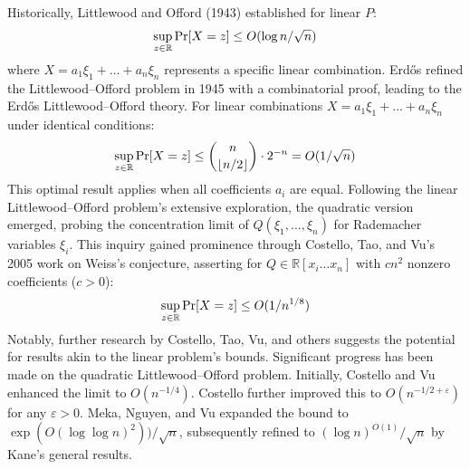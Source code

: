 Historically, Littlewood and Offord (1943) established for linear $P$:
\vspace{-0.4\baselineskip}
\[ \sup_{z\in\mathbb{R}} \Pr[X=z] \leq O(\log n/\sqrt{n}) \vspace{-0.8\baselineskip} \]
\newline
where $X = a_1\xi_1 + \ldots + a_n\xi_n$ represents a specific linear combination.
Erdős refined the Littlewood–Offord problem in 1945 with a combinatorial proof, leading to the Erdős Littlewood–Offord theory. For linear combinations $X = a_1\xi_1 + \ldots + a_n\xi_n$ under identical conditions:
\vspace{-0.2\baselineskip}
\[ \sup_{z\in\mathbb{R}} \Pr[X=z] \leq \binom{n}{\lfloor n/2 \rfloor} \cdot 2^{-n} = O(1/\sqrt{n}) \vspace{-0.5\baselineskip} \]
\newline
This optimal result applies when all coefficients $a_i$ are equal.
Following the linear Littlewood–Offord problem's extensive exploration, the quadratic version emerged, probing the concentration limit of $Q(\xi_1,\ldots,\xi_n)$ for Rademacher variables $\xi_i$. This inquiry gained prominence through Costello, Tao, and Vu's 2005 work on Weiss's conjecture, asserting for $Q \in \mathbb{R}[x_i \ldots x_n]$ with $cn^2$ nonzero coefficients ($c > 0$):
\vspace{-0.24\baselineskip}
\[ \sup_{z\in\mathbb{R}} \Pr[X=z] \leq O(1/n^{1/8}) \vspace{-0.27\baselineskip} \]
\newline
Notably, further research by Costello, Tao, Vu, and others suggests the potential for results akin to the linear problem's bounds.
Significant progress has been made on the quadratic Littlewood–Offord problem. Initially, Costello and Vu enhanced the limit to $O(n^{-1/4})$. Costello further improved this to $O(n^{-1/2+\varepsilon})$ for any $\varepsilon > 0$. Meka, Nguyen, and Vu expanded the bound to $\exp(O(\log\log n)^2))/\sqrt{n}$, subsequently refined to $(\log n)^{O(1)}/\sqrt{n}$ by Kane's general results.

